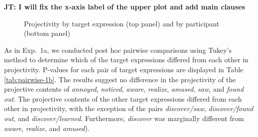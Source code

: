 \documentclass[11pt,fleqn]{article}
\newcommand{\6}{\mbox{$[\hspace*{-.6mm}[$}}
\newcommand{\9}{\mbox{$]\hspace*{-.6mm}]$}}
\newcommand{\tableref}[1]{Table \ref{#1}}
\newcommand{\jt}[1]{\textbf{\color{blue}JT: #1}}
\begin{document}
\jt{I will fix the x-axis label of the upper plot and add main clauses}

\begin{figure}[!h]
\centering


	

\caption{Projectivity by target expression (top panel) and by participant (bottom panel)}
\label{fig:f-proj-1b}
\end{figure}

As in Exp.~1a,  we conducted post hoc pairwise comparisons using Tukey's method to determine which of the target expressions differed from each other in projectivity. P-values for each pair of target expressions are displayed in \tableref{tab:pairwise-1b}. The results suggest no difference in the projectivity of the projective contents of \emph{annoyed}, \emph{noticed}, \emph{aware}, \emph{realize}, \emph{amused}, \emph{saw}, and \emph{found out}. The projective contents of the other target expressions differed from each other in projectivity, with the exception of the pairs \emph{discover/saw}, \emph{discover/found out}, and \emph{discover/learned}. Furthermore, \emph{discover} was  marginally different from \emph{aware}, \emph{realize}, and \emph{amused}).
\end{document}
